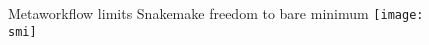 \documentclass[10pt, usenames, dvipsnames]{beamer}
\def\smi{out/ln/updir/mw-gcthesis-oral/library.bib}
\begin{document}
\begin{frame}{Metaworkflow limits Snakemake freedom to bare minimum}
  \def\smi{out/ln/updir/mw-gcthesis-oral/ink/snakemake/venn_snakemake_metaworkflow.pdf}
  \texttt{[image: \\smi]}%
\end{frame}
\end{document}
